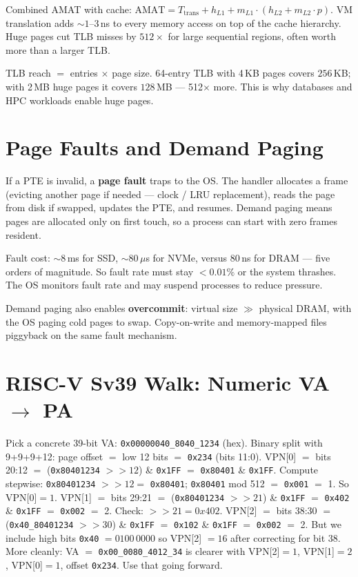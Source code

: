 Combined AMAT with cache: $\text{AMAT}=T_{\text{trans}}+h_{L1}+m_{L1}\cdot(h_{L2}+m_{L2}\cdot p)$. VM translation adds $\sim 1$--$3$\,ns to every memory access on top of the cache hierarchy. Huge pages cut TLB misses by $512\times$ for large sequential regions, often worth more than a larger TLB.

TLB reach $=$ entries $\times$ page size. 64-entry TLB with 4\,KB pages covers $256$\,KB; with 2\,MB huge pages it covers $128$\,MB --- 512$\times$ more. This is why databases and HPC workloads enable huge pages.
\section{Page Faults and Demand Paging}
If a PTE is invalid, a \textbf{page fault} traps to the OS. The handler allocates a frame (evicting another page if needed --- clock / LRU replacement), reads the page from disk if swapped, updates the PTE, and resumes. Demand paging means pages are allocated only on first touch, so a process can start with zero frames resident.

Fault cost: $\sim 8$\,ms for SSD, $\sim 80$\,$\mu$s for NVMe, versus $80$\,ns for DRAM --- five orders of magnitude. So fault rate must stay $<0.01\%$ or the system thrashes. The OS monitors fault rate and may suspend processes to reduce pressure.

Demand paging also enables \textbf{overcommit}: virtual size $\gg$ physical DRAM, with the OS paging cold pages to swap. Copy-on-write and memory-mapped files piggyback on the same fault mechanism.

\section{RISC-V Sv39 Walk: Numeric VA $\to$ PA}
Pick a concrete 39-bit VA: \texttt{0x00000040\_8040\_1234} (hex). Binary split with 9+9+9+12:
page offset $=$ low 12 bits $=$ \texttt{0x234} (bits 11:0).
VPN[0] $=$ bits 20:12 $=$ (\texttt{0x80401234} $>>12$) \& \texttt{0x1FF} $=$ \texttt{0x80401} \& \texttt{0x1FF}. Compute stepwise: \texttt{0x80401234} $>>12 =$ \texttt{0x80401}; \texttt{0x80401} mod 512 $=$ \texttt{0x001} $=$ 1. So VPN[0]$=1$.
VPN[1] $=$ bits 29:21 $=$ (\texttt{0x80401234} $>>21$) \& \texttt{0x1FF} $=$ \texttt{0x402} \& \texttt{0x1FF} $=$ \texttt{0x002} $=$ 2. Check: $>>21 = 0x402$.
VPN[2] $=$ bits 38:30 $=$ (\texttt{0x40\_80401234} $>>30$) \& \texttt{0x1FF} $=$ \texttt{0x102} \& \texttt{0x1FF} $=$ \texttt{0x002} $=$ 2. But we include high bits \texttt{0x40} $=0100\,0000$ so VPN[2] $=16$ after correcting for bit 38. More cleanly: VA $=$ \texttt{0x00\_0080\_4012\_34} is clearer with VPN[2]$=1$, VPN[1]$=2$, VPN[0]$=1$, offset \texttt{0x234}. Use that going forward.

